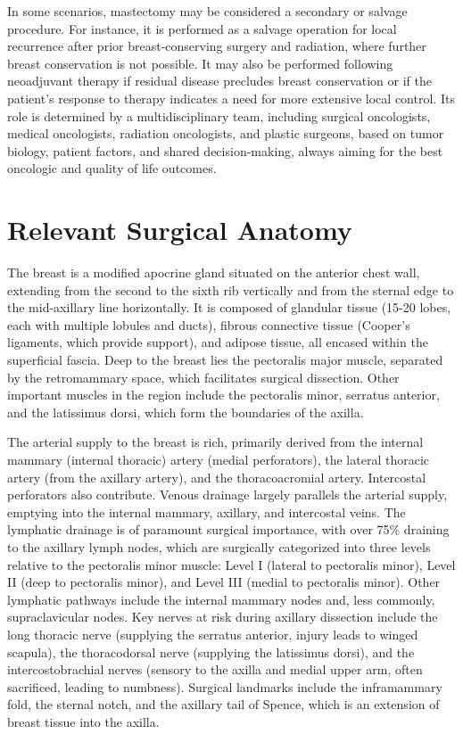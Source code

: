 In some scenarios, mastectomy may be considered a secondary or salvage procedure. For instance, it is performed as a salvage operation for local recurrence after prior breast-conserving surgery and radiation, where further breast conservation is not possible. It may also be performed following neoadjuvant therapy if residual disease precludes breast conservation or if the patient's response to therapy indicates a need for more extensive local control. Its role is determined by a multidisciplinary team, including surgical oncologists, medical oncologists, radiation oncologists, and plastic surgeons, based on tumor biology, patient factors, and shared decision-making, always aiming for the best oncologic and quality of life outcomes.

\section*{Relevant Surgical Anatomy}
The breast is a modified apocrine gland situated on the anterior chest wall, extending from the second to the sixth rib vertically and from the sternal edge to the mid-axillary line horizontally. It is composed of glandular tissue (15-20 lobes, each with multiple lobules and ducts), fibrous connective tissue (Cooper's ligaments, which provide support), and adipose tissue, all encased within the superficial fascia. Deep to the breast lies the pectoralis major muscle, separated by the retromammary space, which facilitates surgical dissection. Other important muscles in the region include the pectoralis minor, serratus anterior, and the latissimus dorsi, which form the boundaries of the axilla.

The arterial supply to the breast is rich, primarily derived from the internal mammary (internal thoracic) artery (medial perforators), the lateral thoracic artery (from the axillary artery), and the thoracoacromial artery. Intercostal perforators also contribute. Venous drainage largely parallels the arterial supply, emptying into the internal mammary, axillary, and intercostal veins. The lymphatic drainage is of paramount surgical importance, with over 75\% draining to the axillary lymph nodes, which are surgically categorized into three levels relative to the pectoralis minor muscle: Level I (lateral to pectoralis minor), Level II (deep to pectoralis minor), and Level III (medial to pectoralis minor). Other lymphatic pathways include the internal mammary nodes and, less commonly, supraclavicular nodes. Key nerves at risk during axillary dissection include the long thoracic nerve (supplying the serratus anterior, injury leads to winged scapula), the thoracodorsal nerve (supplying the latissimus dorsi), and the intercostobrachial nerves (sensory to the axilla and medial upper arm, often sacrificed, leading to numbness). Surgical landmarks include the inframammary fold, the sternal notch, and the axillary tail of Spence, which is an extension of breast tissue into the axilla.

